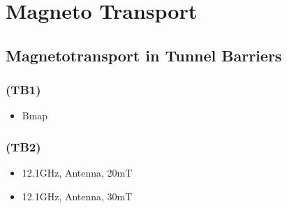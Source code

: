 \chapter{Magneto Transport}
\label{appendix:magneto-transport}

\section[... in Tunnel Barriers]{Magnetotransport in Tunnel Barriers}

    \subsection*{(TB1)}
        \begin{itemize}
            \item Bmap
        \end{itemize}

    \subsection*{(TB2)}
        \begin{itemize}
            \item 12.1GHz, Antenna, 20mT
            \item 12.1GHz, Antenna, 30mT
        \end{itemize}
